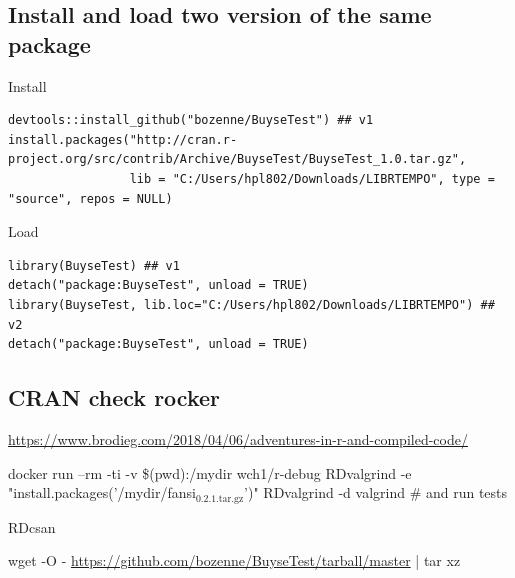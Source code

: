 \documentclass{article}
\begin{document}
\subsection{Install and load two version of the same package}
\label{sec:org792debe}

Install
\lstset{language=r,label= ,caption= ,captionpos=b,numbers=none}
\begin{lstlisting}
devtools::install_github("bozenne/BuyseTest") ## v1
install.packages("http://cran.r-project.org/src/contrib/Archive/BuyseTest/BuyseTest_1.0.tar.gz", 
				 lib = "C:/Users/hpl802/Downloads/LIBRTEMPO", type = "source", repos = NULL)
\end{lstlisting}

Load 
\lstset{language=r,label= ,caption= ,captionpos=b,numbers=none}
\begin{lstlisting}
library(BuyseTest) ## v1
detach("package:BuyseTest", unload = TRUE)
library(BuyseTest, lib.loc="C:/Users/hpl802/Downloads/LIBRTEMPO") ## v2
detach("package:BuyseTest", unload = TRUE)
\end{lstlisting}

\subsection{CRAN check rocker}
\label{sec:org924defa}
\url{https://www.brodieg.com/2018/04/06/adventures-in-r-and-compiled-code/}

docker run --rm -ti -v \$(pwd):/mydir wch1/r-debug
RDvalgrind -e "install.packages('/mydir/fansi\(_{\text{0.2.1.tar.gz}}\)')"
RDvalgrind -d valgrind  \# and run tests

RDcsan

wget -O - \url{https://github.com/bozenne/BuyseTest/tarball/master} | tar xz
\end{document}
